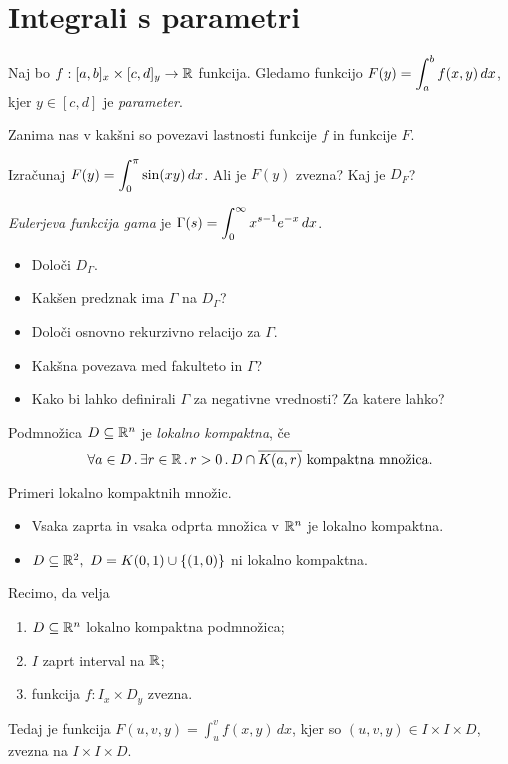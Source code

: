 \section{Integrali s parametri}
Naj bo $f:[a,b]_x \times [c,d]_y \to \mathbb{R}$ funkcija. Gledamo funkcijo $\displaystyle F(y) = \int_{a}^{b}f(x,y) \, dx$, kjer $y \in [c,d]$ je \emph{parameter}.

Zanima nas v kakšni so povezavi lastnosti funkcije $f$ in funkcije $F$.

\begin{zgled}
    Izračunaj $\displaystyle F(y) = \int_{0}^{\pi} \sin (xy) \,dx$. Ali je $F(y)$ zvezna? Kaj je $D_F$?
\end{zgled}

\begin{zgled}
    \emph{Eulerjeva funkcija gama} je $\displaystyle \Gamma (s) = \int_{0}^{\infty} x^{s-1} e^{-x} \, dx$.
    \begin{itemize}
        \item Določi $D_\Gamma$.
        \item Kakšen predznak ima $\Gamma$ na $D_\Gamma$?
        \item Določi osnovno rekurzivno relacijo za $\Gamma$.
        \item Kakšna povezava med fakulteto in $\Gamma$?
        \item Kako bi lahko definirali $\Gamma$ za negativne vrednosti? Za katere lahko?
    \end{itemize}
\end{zgled}

\begin{definicija}
    Podmnožica $D \subseteq \mathbb{R}^n$ je \emph{lokalno kompaktna}, če
    $$\forall a \in D \,.\, \exists r \in \mathbb{R} \, . \, r > 0 \,.\, D \cap \overline{K(a,r)} \text{ kompaktna množica}.$$
\end{definicija}

\begin{zgled}
    Primeri lokalno kompaktnih množic.
    \begin{itemize}
        \item Vsaka zaprta in vsaka odprta množica v $\mathbb{R}^n$ je lokalno kompaktna.
        \item $D \subseteq \mathbb{R}^2, \ D = K(0,1) \cup \{(1,0)\}$ ni lokalno kompaktna.
    \end{itemize}
\end{zgled}

\begin{trditev}
    Recimo, da velja
    \begin{enumerate}
        \item $D \subseteq \mathbb{R}^n$ lokalno kompaktna podmnožica;
        \item $I$ zaprt interval na $\mathbb{R}$;
        \item funkcija $f: I_x \times D_y$ zvezna.
    \end{enumerate}
    Tedaj je funkcija $\displaystyle F(u, v, y) = \int_{u}^{v}f(x,y) \, dx$, kjer so $(u, v, y) \in I \times I \times D$, zvezna na $I \times I \times D$.
\end{trditev}

